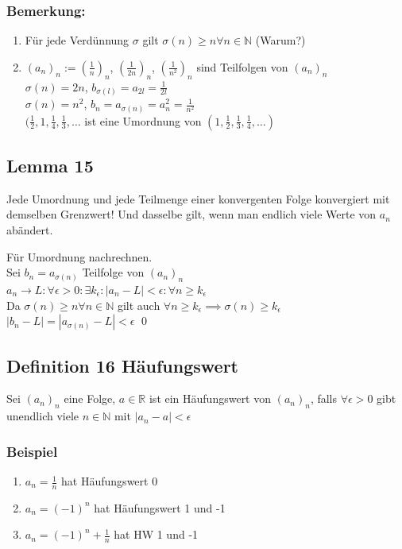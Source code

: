 \documentclass[fleqn]{scrbook}
\newcommand{\R}{\mathbb{R}}
\newcommand{\N}{\mathbb{N}}
\renewenvironment{proof}{{\bfseries Beweis }}{\qed}
\begin{document}
\subsubsection{Bemerkung:}
\begin{enumerate}[1)]
\item Für jede Verdünnung $\sigma$ gilt $\sigma (n) \geq n \forall n \in \N$ (Warum?)
\item $(a_n)_n := (\frac{1}{n})_n$, $(\frac{1}{2n})_n$, $(\frac{1}{n^2})_n$ sind Teilfolgen von $(a_n)_n$\\
$\sigma(n) = 2n$, $b_{\sigma(l)} = a_{2l} = \frac{1}{2l}$\\
$\sigma(n) = n^2$, $b_n = a_{\sigma(n)} = a_n^2 = \frac{1}{n^2}$\\
$(\frac{1}{2}, 1, \frac{1}{4}, \frac{1}{3}, \ldots$ ist eine Umordnung von $(1, \frac{1}{2}, \frac{1}{3}, \frac{1}{4}, \ldots)$
\end{enumerate}
\subsection{Lemma 15} Jede Umordnung und jede Teilmenge einer konvergenten Folge konvergiert mit demselben Grenzwert! Und dasselbe gilt, wenn man endlich viele Werte von $a_n$ abändert.

\begin{proof}
Für Umordnung nachrechnen.\\
Sei $b_n = a_{\sigma(n)}$ Teilfolge von $(a_n)_n$\\
$a_n \rightarrow L : \forall \epsilon > 0 : \exists k_\epsilon: |a_n - L| < \epsilon : \forall n \geq k_\epsilon$\\
Da $\sigma(n) \geq n \forall n \in \N$ gilt auch $\forall n \geq k_\epsilon \implies \sigma(n) \geq k_\epsilon $  \\
$|b_n - L| = |a_{\sigma(n)} - L| < \epsilon$
\end{proof}
\subsection{Definition 16 Häufungswert}
Sei $(a_n)_n$ eine Folge, $a\in\R$ ist ein Häufungswert von $(a_n)_n$, falls $\forall \epsilon > 0$ gibt unendlich viele $n\in\N$ mit $|a_n - a| < \epsilon$
\subsubsection{Beispiel} 
\begin{enumerate}
\item $a_n = \frac{1}{n}$ hat Häufungswert 0

\item $a_n = (-1)^n$ hat Häufungswert 1 und -1

\item $a_n = (-1)^n + \frac{1}{n}$ hat HW 1 und -1

\end{enumerate}
\end{document}
